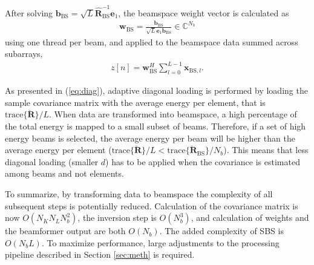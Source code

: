 \documentclass[journal]{IEEEtran}
\newcommand{\mat}[1]{\mathbf{#1}}
\renewcommand{\vec}[1]{\mathbf{#1}}
\begin{document}
After solving $\vec{b}_\text{BS} = \sqrt{L}\mat{\hat{R}}_\text{BS}^{-1}\vec{e}_1$, the beamspace weight vector is calculated as 
\begin{align}
\vec{w}_\text{BS} = \frac{\vec{b}_\text{BS}}{\sqrt{L}\vec{e}_1\vec{b}_\text{BS}} \in \mathbb{C}^{N_b}
\end{align}  
using one thread per beam, and applied to the beamspace data summed across subarrays,
\begin{align}
z[n] = \vec{w}_\text{BS}^H\sum_{l=0}^{L-1}\vec{x}_{\text{BS},l}. 
\end{align}


As presented in (\ref{eq:diag}), adaptive diagonal loading is performed by loading the sample covariance matrix with the average energy per element, that is $\text{trace}\{\mat{\breve{R}}\}/L$. When data are transformed into beamspace, a high percentage of the total energy is mapped to a small subset of beams. Therefore, if a set of high energy beams is selected, the average energy per beam will be higher than the average energy per element ($\text{trace}\{\mat{\breve{R}}\}/L < \text{trace}\{\mat{\breve{R}}_{\text{BS}}\}/N_b$). This means that less diagonal loading (smaller $d$) has to be applied when the covariance is estimated among beams and not elements. 

To summarize, by transforming data to beamspace the complexity of all subsequent steps is potentially reduced. Calculation of the covariance matrix is now $O(N_KN_LN_b^2)$, the inversion step is $O(N_b^3)$, and calculation of weights and the beamformer output are both $O(N_b)$. The added complexity of SBS is $O(N_bL)$. To maximize performance, large adjustments to the processing pipeline described in Section \ref{sec:meth} is required. 



\end{document}
